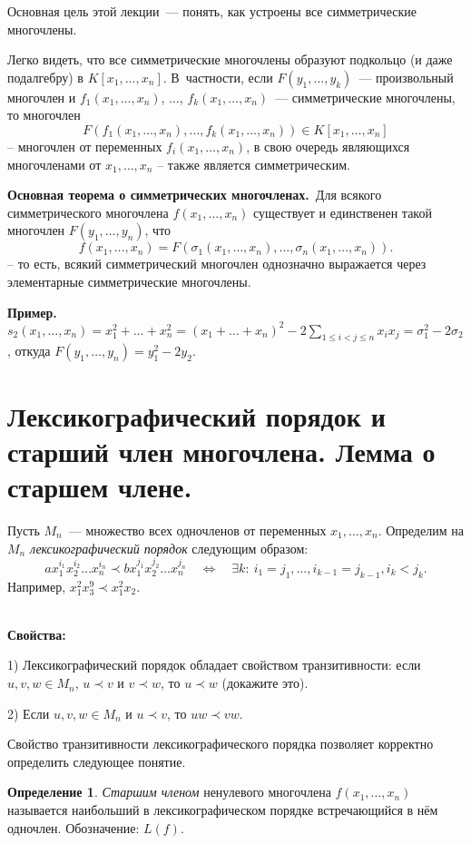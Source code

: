 \documentclass[a4paper, 12pt]{article}
\theoremstyle{definition}
\newtheorem{definition}{Определение}
\theoremstyle{remark}
\begin{document}
Основная цель этой лекции~--- понять, как устроены все
симметрические многочлены.

Легко видеть, что все симметрические многочлены образуют подкольцо
(и даже подалгебру) в $K[x_1, \ldots, x_n]$. В~частности, если
$F(y_1, \ldots, y_k)$~--- произвольный многочлен и $f_1(x_1, \ldots,
x_n)$, $\ldots$, $f_k(x_1, \ldots, x_n)$~--- симметрические
многочлены, то многочлен
$$
F(f_1(x_1, \ldots, x_n), \ldots, f_k(x_1, \ldots, x_n)) \in K[x_1,
\ldots, x_n]
$$
-- многочлен от переменных $f_i(x_1, \ldots,
x_n)$, в свою очередь являющихся многочленами от $x_1, \ldots, x_n$ -- также является симметрическим.

{\bf Основная теорема о симметрических многочленах.}\ Для всякого
симметрического многочлена $f(x_1, \ldots, x_n)$ существует и
единственен такой многочлен $F(y_1, \ldots, y_n)$, что
$$
f(x_1, \ldots, x_n) = F(\sigma_1(x_1, \ldots, x_n), \ldots,
\sigma_n(x_1, \ldots, x_n)).
$$ -- то есть, всякий симметрический
многочлен однозначно выражается через элементарные симметрические
многочлены.

\textbf{Пример.} $s_2(x_1, \ldots, x_n) = x_1^2 + \ldots + x_n^2 =
(x_1 + \ldots + x_n)^2 - 2\sum \limits_{1 \leqslant i < j \leqslant
n} x_i x_j = \sigma_1^2 - 2\sigma_2$, откуда $F(y_1, \ldots, y_n) =
y_1^2 - 2y_2$.


\section{Лексикографический порядок и старший член многочлена. Лемма о старшем члене.}

Пусть $M_n$~--- множество всех одночленов от переменных $x_1,
\ldots, x_n$. Определим на $M_n$ {\it лексикографический порядок}
следующим образом:
$$
ax_1^{i_1}x_2^{i_2}\ldots x_n^{i_n} \prec bx_1^{j_1}x_2^{j_2}\ldots
x_n^{j_n} \quad \Leftrightarrow \quad \exists k: \: i_1=j_1,\ldots,
i_{k-1}=j_{k-1}, i_k<j_k.
$$
Например, $x_1^2x_3^9 \prec x_1^2x_2$.

\ \\
\textbf{Свойства:}

1) Лексикографический порядок обладает свойством
транзитивности: если $u,v,w \in M_n$, $u \prec v$ и $v \prec w$, то
$u \prec w$ (докажите это).

2) Если $u,v,w \in M_n$ и $u \prec v$, то $uw \prec vw$.

Свойство транзитивности лексикографического порядка позволяет
корректно определить следующее понятие.

\begin{definition}
{\it Старшим членом} ненулевого многочлена $f(x_1,\ldots,x_n)$
называется наибольший в лексикографическом порядке встречающийся в нём
одночлен. Обозначение: $L(f)$.
\end{definition}
\end{document}
